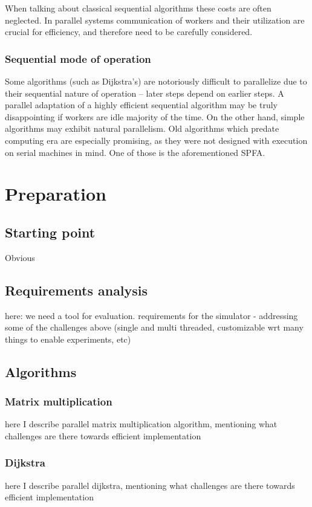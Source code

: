 \documentclass[12pt,a4paper,twoside,openright]{report}
\begin{document}
When talking about classical sequential algorithms these costs are often neglected. In parallel systems communication of workers and their utilization are crucial for efficiency, and therefore need to be carefully considered.

\subsection{Sequential mode of operation}
Some algorithms (such as Dijkstra's) are notoriously difficult to parallelize due to their sequential nature of operation -- later steps depend on earlier steps. A parallel adaptation of a highly efficient sequential algorithm may be truly disappointing if workers are idle majority of the time. On the other hand, simple algorithms may exhibit natural parallelism. Old algorithms which predate computing era are especially promising, as they were not designed with execution on serial machines in mind. One of those is the aforementioned SPFA.

\chapter{Preparation}
\section{Starting point}
Obvious
\section{Requirements analysis}
here: we need a tool for evaluation. requirements for the simulator - addressing some of the challenges above (single and multi threaded, customizable wrt many things to enable experiments, etc)

\section{Algorithms}

\subsection{Matrix multiplication}
here I describe parallel matrix multiplication algorithm, mentioning what challenges are there towards efficient implementation

\subsection{Dijkstra}
here I describe parallel dijkstra, mentioning what challenges are there towards efficient implementation
\end{document}
